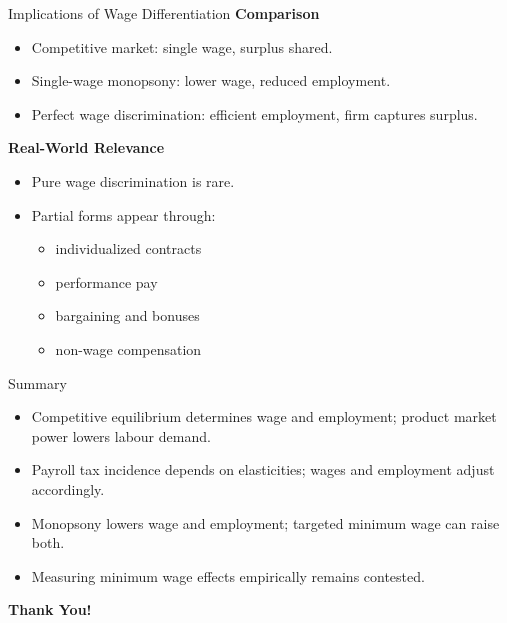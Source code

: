 \documentclass[aspectratio=169]{beamer}
\begin{document}
\begin{frame}{Implications of Wage Differentiation}
\textbf{Comparison}
\begin{itemize}
\item Competitive market: single wage, surplus shared.
\item Single-wage monopsony: lower wage, reduced employment.
\item Perfect wage discrimination: efficient employment, firm captures surplus.
\end{itemize}

\textbf{Real-World Relevance}
\begin{itemize}
\item Pure wage discrimination is rare.
\item Partial forms appear through:
\begin{itemize}
\item individualized contracts
\item performance pay
\item bargaining and bonuses
\item non-wage compensation
\end{itemize}
\end{itemize}

\end{frame}









\begin{frame}{Summary}
\transfade
\begin{itemize}[<+->]
  \item Competitive equilibrium determines wage and employment; product market power lowers labour demand.
  \item Payroll tax incidence depends on elasticities; wages and employment adjust accordingly.
  \item Monopsony lowers wage and employment; targeted minimum wage can raise both.
  \item Measuring minimum wage effects empirically remains contested.
\end{itemize}
\end{frame}

\begin{frame}
\centering
\Huge{\textbf{Thank You!}} \\

\end{frame}
\end{document}
